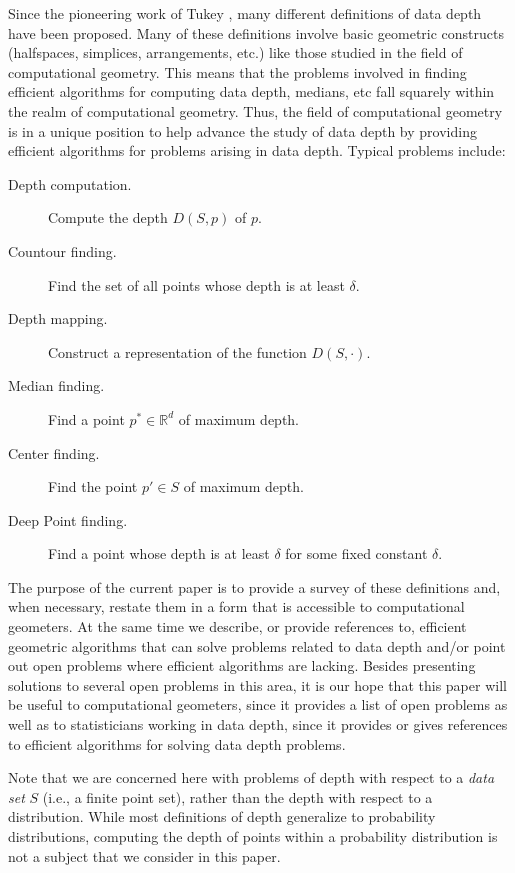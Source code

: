 \documentclass[lotsofwhite,charterfonts]{patmorin}
\begin{document}
Since the pioneering work of Tukey \cite{t75}, many different
definitions of data depth have been proposed.  Many of these
definitions involve basic geometric constructs (halfspaces, simplices,
arrangements, etc.) like those studied in the field of computational
geometry.  This means that the problems involved in finding efficient
algorithms for computing data depth, medians, etc fall squarely within
the realm of computational geometry.  Thus, the field of computational
geometry is in a unique position to help advance the study of data
depth by providing efficient algorithms for problems arising in data
depth.  Typical problems include:

\begin{description}
\item[Depth computation.] Compute the depth $D(S,p)$ of $p$.

\item[Countour finding.] Find the set of all points whose depth is at least
$\delta$.

\item[Depth mapping.] Construct a representation of the function
$D(S,\cdot)$.

\item[Median finding.] Find a point $p^*\in \mathbb{R}^d$ of maximum depth.

\item[Center finding.] Find the point $p'\in S$ of maximum depth.

\item[Deep Point finding.] Find a point whose depth is at least $\delta$ for
some fixed constant $\delta$.
\end{description}

The purpose of the current paper is to provide a survey of these
definitions and, when necessary, restate them in a form that is
accessible to computational geometers.  At the same time we describe,
or provide references to, efficient geometric algorithms that can
solve problems related to data depth and/or point out open problems
where efficient algorithms are lacking.  Besides presenting solutions
to several open problems in this area, it is our hope that this paper
will be useful to computational geometers, since it provides a list of
open problems as well as to statisticians working in data depth, since
it provides or gives references to efficient algorithms for solving
data depth problems. 

Note that we are concerned here with problems of depth with respect to
a \emph{data set} $S$ (i.e., a finite point set), rather than the
depth with respect to a distribution.  While most definitions of depth
generalize to probability distributions, computing the depth of points
within a probability distribution is not a subject that we consider in
this paper.
\end{document}
